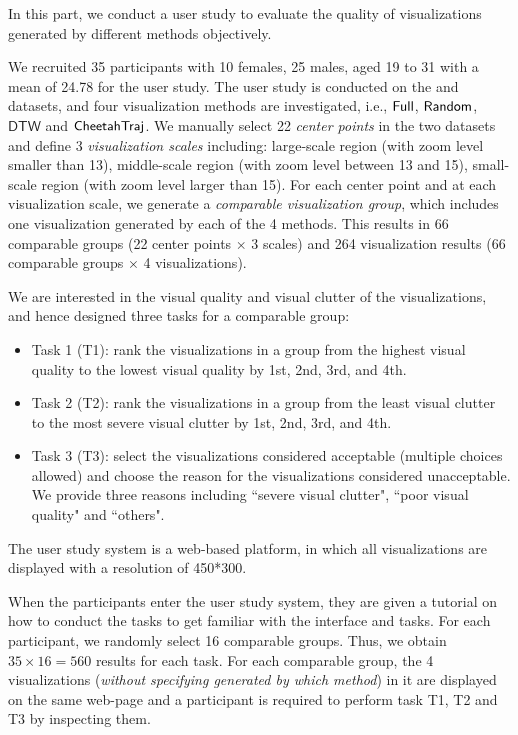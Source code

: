 In this part, we conduct a user study to evaluate the quality of visualizations generated by different methods objectively.

We recruited 35 participants with 10 females, 25 males, aged 19 to 31 with a mean of 24.78 for the user study. 
The user study is conducted on the \pt{} and \sz{} datasets, and four visualization methods are investigated, i.e., $\mathsf{Full}$, $\mathsf{Random}$, $\mathsf{DTW}$ and $\mathsf{CheetahTraj}$. We manually select 22 \textit{center points} in the two datasets and define 3 \textit{visualization scales} including:
large-scale region (with zoom level smaller than 13), middle-scale region (with zoom level between 13 and 15), small-scale region (with zoom level larger than 15). For each center point and at each visualization scale, we generate a \textit{comparable visualization group}, which includes one visualization generated by each of the 4 methods. This results in 66 comparable groups (22 center points $\times$ 3 scales) and 264 visualization results (66 comparable groups $\times$ 4 visualizations).

We are interested in the visual quality and visual clutter of the visualizations, and hence designed three tasks for a comparable group:
\begin{itemize}
	\item Task 1 (T1): rank the visualizations in a group from the highest visual quality to the lowest visual quality by 1st, 2nd, 3rd, and 4th.
	\item Task 2 (T2): rank the visualizations in a group from the least visual clutter to the most severe visual clutter by 1st, 2nd, 3rd, and 4th.
	\item Task 3 (T3): select the visualizations considered acceptable (multiple choices allowed) and choose the reason for the visualizations considered unacceptable. We provide three reasons including ``severe visual clutter", ``poor visual quality" and ``others".
\end{itemize}

The user study system is a web-based platform, in which all visualizations are displayed with a resolution of 450*300.


 When the participants enter the user study system, they are given a tutorial on how to conduct the tasks to get familiar with the interface and tasks.
For each participant, we randomly select 16 comparable groups.
Thus, we obtain $35 \times 16 = 560$ results for each task.
For each comparable group, the 4 visualizations (\textit{without specifying generated by which method}) in it are displayed on the same web-page and a participant is required to perform task T1, T2 and T3 by inspecting them.

